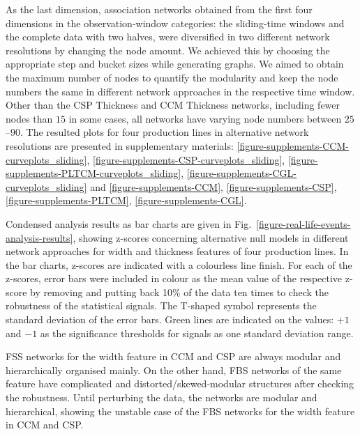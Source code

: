 As the last dimension, association networks obtained from the first four dimensions in the observation-window categories: the sliding-time windows and the complete data with two halves, were diversified in two different network resolutions by changing the node amount. We achieved this by choosing the appropriate step and bucket sizes while generating graphs. We aimed to obtain the maximum number of nodes to quantify the modularity and keep the node numbers the same in different network approaches in the respective time window. Other than the CSP Thickness and CCM Thickness networks, including fewer nodes than $15$ in some cases, all networks have varying node numbers between $25$--$90$. The resulted plots for four production lines in alternative network resolutions are presented in supplementary materials: \ref{figure-supplements-CCM-curveplots_sliding}, \ref{figure-supplements-CSP-curveplots_sliding}, \ref{figure-supplements-PLTCM-curveplots_sliding}, \ref{figure-supplements-CGL-curveplots_sliding} and \ref{figure-supplements-CCM}, \ref{figure-supplements-CSP}, \ref{figure-supplements-PLTCM}, \ref{figure-supplements-CGL}.

Condensed analysis results as bar charts are given in Fig.~\ref{figure-real-life-events-analysis-results}, showing z-scores concerning alternative null models in different network approaches for width and thickness features of four production lines. In the bar charts, z-scores are indicated with a colourless line finish. For each of the z-scores, error bars were included in colour as the mean value of the respective z-score by removing and putting back 10\% of the data ten times to check the robustness of the statistical signals. The T-shaped symbol represents the standard deviation of the error bars. Green lines are indicated on the values: $+1$ and $-1$ as the significance thresholds for signals as one standard deviation range.
\renewcommand{\aa}{Analysis Bar Chart Results:}


\newcommand{\bb}{Modularity Values and Z-scores in Different Network Resolutions}
\newcommand{\cc}{Analysis Curve Plot Results:}
\newcommand{\dd}{Modularity Values and Z-scores in Sliding-time Windows\& Different Network Resolutions}
\newcommand{\ee}{Modularity Values and Z-scores in Discrete-time Windows}

FSS networks for the width feature in CCM and CSP are always modular and hierarchically organised mainly. On the other hand, FBS networks of the same feature have complicated and distorted/skewed-modular structures after checking the robustness. Until perturbing the data, the networks are modular and hierarchical, showing the unstable case of the FBS networks for the width feature in CCM and CSP.

